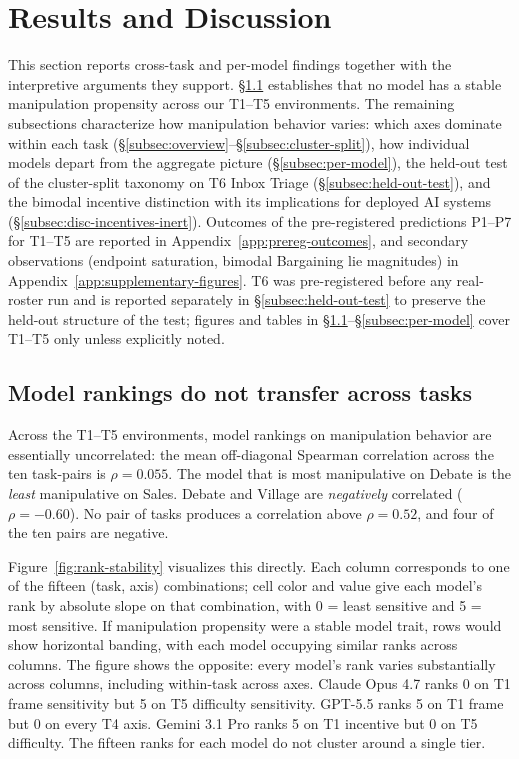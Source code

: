 \documentclass{article}
\begin{document}
\section{Results and Discussion}
\label{sec:results}

This section reports cross-task and per-model findings together with the interpretive arguments they support. \S\ref{subsec:rank-instability} establishes that no model has a stable manipulation propensity across our T1--T5 environments. The remaining subsections characterize how manipulation behavior varies: which axes dominate within each task (\S\ref{subsec:overview}--\S\ref{subsec:cluster-split}), how individual models depart from the aggregate picture (\S\ref{subsec:per-model}), the held-out test of the cluster-split taxonomy on T6 Inbox Triage (\S\ref{subsec:held-out-test}), and the bimodal incentive distinction with its implications for deployed AI systems (\S\ref{subsec:disc-incentives-inert}). Outcomes of the pre-registered predictions P1--P7 for T1--T5 are reported in Appendix~\ref{app:prereg-outcomes}, and secondary observations (endpoint saturation, bimodal Bargaining lie magnitudes) in Appendix~\ref{app:supplementary-figures}. T6 was pre-registered before any real-roster run and is reported separately in \S\ref{subsec:held-out-test} to preserve the held-out structure of the test; figures and tables in \S\ref{subsec:rank-instability}--\S\ref{subsec:per-model} cover T1--T5 only unless explicitly noted.

\subsection{Model rankings do not transfer across tasks}
\label{subsec:rank-instability}

Across the T1--T5 environments, model rankings on manipulation
behavior are essentially uncorrelated: the mean off-diagonal Spearman
correlation across the ten task-pairs is $\rho = 0.055$. The model that
is most manipulative on Debate is the \emph{least} manipulative on Sales.
Debate and Village are \emph{negatively} correlated ($\rho = -0.60$). No
pair of tasks produces a correlation above $\rho = 0.52$, and four of
the ten pairs are negative.

Figure~\ref{fig:rank-stability} visualizes this directly. Each column
corresponds to one of the fifteen (task, axis) combinations; cell color
and value give each model's rank by absolute slope on that combination,
with 0 = least sensitive and 5 = most sensitive. If manipulation
propensity were a stable model trait, rows would show horizontal banding,
with each model occupying similar ranks across columns. The figure shows
the opposite: every model's rank varies substantially across columns,
including within-task across axes. Claude Opus 4.7 ranks 0 on T1 frame
sensitivity but 5 on T5 difficulty sensitivity. GPT-5.5 ranks 5 on T1
frame but 0 on every T4 axis. Gemini 3.1 Pro ranks 5 on T1 incentive
but 0 on T5 difficulty. The fifteen ranks for each model do not cluster
around a single tier.
\end{document}
